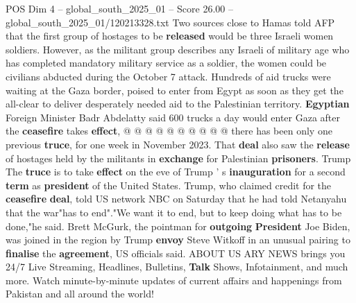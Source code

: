 \begin{textsample}{POS Dim 4 – global\_south\_2025\_01 – Score 26.00 – global\_south\_2025\_01/120213328.txt}
Two sources close to Hamas told AFP that the first group of hostages to be \textbf{released} would be three Israeli women soldiers.
However, as the militant group describes any Israeli of military age who has completed mandatory military service as a soldier, the women could be civilians abducted during the October 7 attack.
Hundreds of aid trucks were waiting at the Gaza border, poised to enter from Egypt as soon as they get the all-clear to deliver desperately needed aid to the Palestinian territory. \textbf{Egyptian} Foreign Minister Badr Abdelatty said 600 trucks a day would enter Gaza after the \textbf{ceasefire} takes \textbf{effect}, @ @ @ @ @ @ @ @ @ @ there has been only one previous \textbf{truce}, for one week in November 2023.
That \textbf{deal} also saw the \textbf{release} of hostages held by the militants in \textbf{exchange} for Palestinian \textbf{prisoners}.
Trump The \textbf{truce} is to take \textbf{effect} on the eve of Trump ' s \textbf{inauguration} for a second \textbf{term} as \textbf{president} of the United States.
Trump, who claimed credit for the \textbf{ceasefire} \textbf{deal}, told US network NBC on Saturday that he had told Netanyahu that the war"has to end"."We want it to end, but to keep doing what has to be done,"he said.
Brett McGurk, the pointman for \textbf{outgoing} \textbf{President} Joe Biden, was joined in the region by Trump \textbf{envoy} Steve Witkoff in an unusual pairing to \textbf{finalise} the \textbf{agreement}, US officials said.
ABOUT US ARY NEWS brings you 24/7 Live Streaming, Headlines, Bulletins, \textbf{Talk} Shows, Infotainment, and much more.
Watch minute-by-minute updates of current affairs and happenings from Pakistan and all around the world!

\end{textsample}
